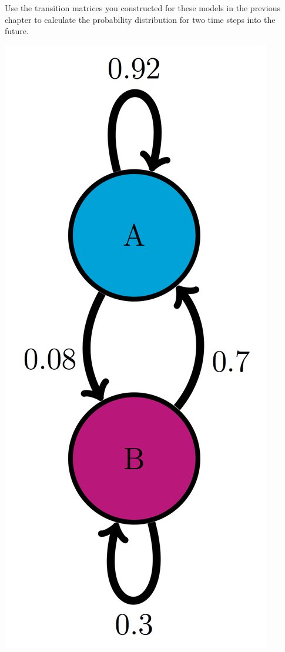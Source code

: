 \documentclass[
  letterpaper,
  DIV=11,
  numbers=noendperiod]{scrreprt}
\begin{document}
Use the transition matrices you constructed for these models in the
previous chapter to calculate the probability distribution for two time
steps into the future.

\includegraphics{./ch10/AB_trans_diag.png}
\end{document}
